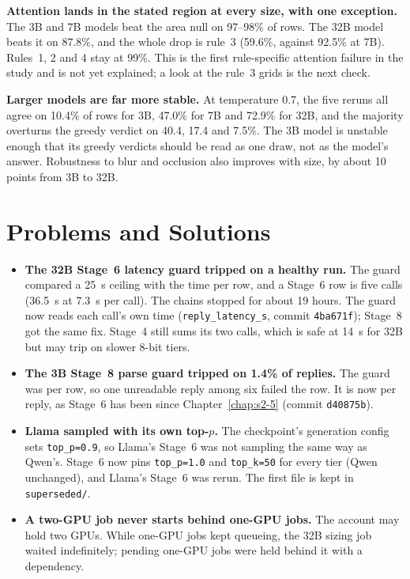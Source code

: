 \textbf{Attention lands in the stated region at every size, with one exception.} The 3B and 7B models beat
the area null on 97--98\% of rows. The 32B model beats it on 87.8\%, and the whole drop is rule~3 (59.6\%,
against 92.5\% at 7B). Rules~1, 2 and 4 stay at 99\%. This is the first rule-specific attention failure in
the study and is not yet explained; a look at the rule~3 grids is the next check.

\textbf{Larger models are far more stable.} At temperature 0.7, the five reruns all agree on 10.4\% of rows
for 3B, 47.0\% for 7B and 72.9\% for 32B, and the majority overturns the greedy verdict on 40.4, 17.4 and
7.5\%. The 3B model is unstable enough that its greedy verdicts should be read as one draw, not as the
model's answer. Robustness to blur and occlusion also improves with size, by about 10 points from 3B to
32B.

\section{Problems and Solutions}

\begin{itemize}
\item \textbf{The 32B Stage~6 latency guard tripped on a healthy run.} The guard compared a 25~s ceiling
with the time per row, and a Stage~6 row is five calls (36.5~s at 7.3~s per call). The chains stopped for
about 19 hours. The guard now reads each call's own time (\texttt{reply\_latency\_s}, commit
\texttt{4ba671f}); Stage~8 got the same fix. Stage~4 still sums its two calls, which is safe at 14~s for
32B but may trip on slower 8-bit tiers.
\item \textbf{The 3B Stage~8 parse guard tripped on 1.4\% of replies.} The guard was per row, so one
unreadable reply among six failed the row. It is now per reply, as Stage~6 has been since
Chapter~\ref{chap:s2-5} (commit \texttt{d40875b}).
\item \textbf{Llama sampled with its own top-$p$.} The checkpoint's generation config sets
\texttt{top\_p=0.9}, so Llama's Stage~6 was not sampling the same way as Qwen's. Stage~6 now pins
\texttt{top\_p=1.0} and \texttt{top\_k=50} for every tier (Qwen unchanged), and Llama's Stage~6 was rerun.
The first file is kept in \texttt{superseded/}.
\item \textbf{A two-GPU job never starts behind one-GPU jobs.} The account may hold two GPUs. While
one-GPU jobs kept queueing, the 32B sizing job waited indefinitely; pending one-GPU jobs were held behind
it with a dependency.
\end{itemize}

